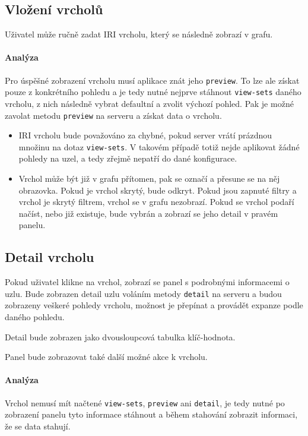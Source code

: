 \subsection*{Vložení vrcholů}
Uživatel může ručně zadat IRI vrcholu, který se následně zobrazí v grafu.

\paragraph{Analýza} Pro úspěšné zobrazení vrcholu musí aplikace znát jeho \texttt{preview}. To lze ale získat pouze z konkrétního pohledu a je tedy nutné nejprve stáhnout \texttt{view-sets} daného vrcholu, z nich následně vybrat defaultní a zvolit výchozí pohled. Pak je možné zavolat metodu \texttt{preview} na serveru a získat data o vrcholu.

\begin{itemize}
    \item IRI vrcholu bude považováno za chybné, pokud server vrátí prázdnou množinu na dotaz \texttt{view-sets}. V takovém případě totiž nejde aplikovat žádné pohledy na uzel, a tedy zřejmě nepatří do dané konfigurace.
    \item Vrchol může být již v grafu přítomen, pak se označí a přesune se na něj obrazovka. Pokud je vrchol skrytý, bude odkryt. Pokud jsou zapnuté filtry a vrchol je skrytý filtrem, vrchol se v grafu nezobrazí. Pokud se vrchol podaří načíst, nebo již existuje, bude vybrán a zobrazí se jeho detail v pravém panelu.
\end{itemize}

\subsection*{Detail vrcholu}
Pokud uživatel klikne na vrchol, zobrazí se panel s podrobnými informacemi o uzlu. Bude zobrazen detail uzlu voláním metody \texttt{detail} na serveru a budou zobrazeny veškeré pohledy vrcholu, možnost je přepínat a provádět expanze podle daného pohledu.

Detail bude zobrazen jako dvousloupcová tabulka klíč-hodnota.

Panel bude zobrazovat také další možné akce k vrcholu.

\paragraph{Analýza} Vrchol nemusí mít načtené \texttt{view-sets}, \texttt{preview} ani \texttt{detail}, je tedy nutné po zobrazení panelu tyto informace stáhnout a během stahování zobrazit informaci, že se data stahují.

